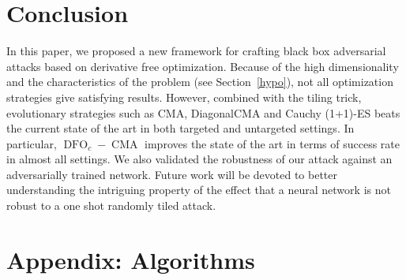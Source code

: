 \section{Conclusion}
\label{sec:conc}
In this paper, we proposed a new framework for crafting black box adversarial attacks based on derivative free optimization. Because of the high dimensionality and the characteristics of the problem (see Section~\ref{hypo}), not all optimization strategies give satisfying results. However, combined with the tiling trick, evolutionary strategies such as CMA, DiagonalCMA and  Cauchy (1+1)-ES beats the current state of the art in both targeted and untargeted settings.  In particular, $\operatorname{DFO}_c-\operatorname{CMA}$ improves the state of the art in terms of success rate in almost all settings. We also validated the robustness of our attack against an adversarially trained network. Future work will be devoted to better understanding the intriguing property of the effect that a neural network is not robust to a one shot randomly tiled attack.










    

\section{Appendix: Algorithms}
